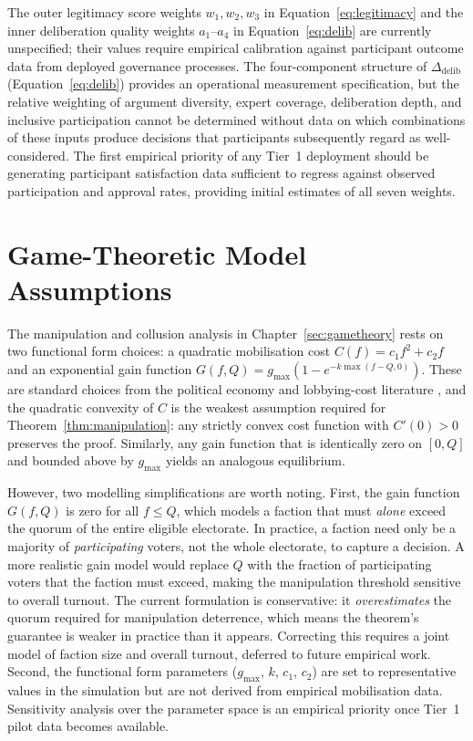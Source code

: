\documentclass[12pt,a4paper,oneside]{report}
\begin{document}
The outer legitimacy score weights $w_1, w_2, w_3$ in Equation~\ref{eq:legitimacy} and the inner deliberation quality weights $a_1$--$a_4$ in Equation~\ref{eq:delib} are currently unspecified; their values require empirical calibration against participant outcome data from deployed governance processes. The four-component structure of $\Delta_{\text{delib}}$ (Equation~\ref{eq:delib}) provides an operational measurement specification, but the relative weighting of argument diversity, expert coverage, deliberation depth, and inclusive participation cannot be determined without data on which combinations of these inputs produce decisions that participants subsequently regard as well-considered. The first empirical priority of any Tier~1 deployment should be generating participant satisfaction data sufficient to regress against observed participation and approval rates, providing initial estimates of all seven weights.

\section{Game-Theoretic Model Assumptions}

The manipulation and collusion analysis in Chapter~\ref{sec:gametheory} rests on two functional form choices: a quadratic mobilisation cost $C(f) = c_1 f^2 + c_2 f$ and an exponential gain function $G(f,Q) = g_{\max}(1 - e^{-k\max(f-Q,0)})$. These are standard choices from the political economy and lobbying-cost literature \citep{austen1989interest}, and the quadratic convexity of $C$ is the weakest assumption required for Theorem~\ref{thm:manipulation}: any strictly convex cost function with $C'(0) > 0$ preserves the proof. Similarly, any gain function that is identically zero on $[0, Q]$ and bounded above by $g_{\max}$ yields an analogous equilibrium.

However, two modelling simplifications are worth noting. First, the gain function $G(f,Q)$ is zero for all $f \leq Q$, which models a faction that must \emph{alone} exceed the quorum of the entire eligible electorate. In practice, a faction need only be a majority of \emph{participating} voters, not the whole electorate, to capture a decision. A more realistic gain model would replace $Q$ with the fraction of participating voters that the faction must exceed, making the manipulation threshold sensitive to overall turnout. The current formulation is conservative: it \emph{overestimates} the quorum required for manipulation deterrence, which means the theorem's guarantee is weaker in practice than it appears. Correcting this requires a joint model of faction size and overall turnout, deferred to future empirical work. Second, the functional form parameters ($g_{\max}$, $k$, $c_1$, $c_2$) are set to representative values in the simulation but are not derived from empirical mobilisation data. Sensitivity analysis over the parameter space is an empirical priority once Tier~1 pilot data becomes available.
\end{document}
